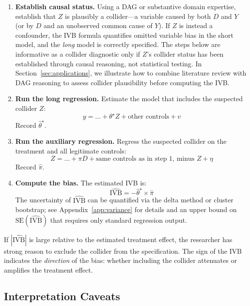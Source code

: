 \documentclass[
]{article}
\begin{document}
\begin{enumerate}
\item[\textbf{Step 0.}] \textbf{Establish causal status.} Using a DAG or substantive domain expertise, establish that $Z$ is plausibly a collider---a variable caused by both $D$ and $Y$ (or by $D$ and an unobserved common cause of $Y$). If $Z$ is instead a confounder, the IVB formula quantifies omitted variable bias in the short model, and the \textit{long} model is correctly specified. The steps below are informative as a collider diagnostic only if $Z$'s collider status has been established through causal reasoning, not statistical testing. In Section~\ref{sec:applications}, we illustrate how to combine literature review with DAG reasoning to assess collider plausibility before computing the IVB.

\item \textbf{Run the long regression.} Estimate the model that includes the suspected collider $Z$:
\[
y = \ldots + \theta^{\star} Z + \text{other controls} + v
\]
Record $\hat{\theta}^{\star}$.

\item \textbf{Run the auxiliary regression.} Regress the suspected collider on the treatment and all legitimate controls:
\[
Z = \ldots + \pi D + \text{same controls as in step 1, minus } Z + \eta
\]
Record $\hat{\pi}$.

\item \textbf{Compute the bias.} The estimated IVB is:
\[
\widehat{\text{IVB}} = -\hat{\theta}^{\star} \times \hat{\pi}
\]
The uncertainty of $\widehat{\text{IVB}}$ can be quantified via the delta method or cluster bootstrap; see Appendix~\ref{app:variance} for details and an upper bound on $\text{SE}(\widehat{\text{IVB}})$ that requires only standard regression output.
\end{enumerate}

If \(|\widehat{\text{IVB}}|\) is large relative to the estimated
treatment effect, the researcher has strong reason to exclude the
collider from the specification. The sign of the IVB indicates the
\emph{direction} of the bias: whether including the collider attenuates
or amplifies the treatment effect.

\subsection{\texorpdfstring{Interpretation Caveats
\label{sec:caveats}}{Interpretation Caveats }}\label{interpretation-caveats}
\end{document}
